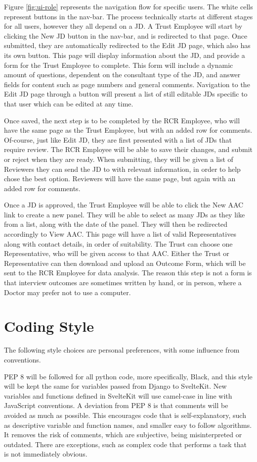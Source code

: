 Figure \ref{fig:ui-role} represents the navigation flow for specific users. The white cells represent buttons in the nav-bar. The process technically starts at different stages for all users, however they all depend on a JD. A Trust Employee will start by clicking the New JD button in the nav-bar, and is redirected to that page. Once submitted, they are automatically redirected to the Edit JD page, which also has its own button. This page will display information about the JD, and provide a form for the Trust Employee to complete. This form will include a dynamic amount of questions, dependent on the consultant type of the JD, and answer fields for content such as page numbers and general comments. Navigation to the Edit JD page through a button will present a list of still editable JDs specific to that user which can be edited at any time.

Once saved, the next step is to be completed by the RCR Employee, who will have the same page as the Trust Employee, but with an added row for comments. Of-course, just like Edit JD, they are first presented with a list of JDs that require review. The RCR Employee will be able to save their changes, and submit or reject when they are ready. When submitting, they will be given a list of Reviewers they can send the JD to with relevant information, in order to help chose the best option. Reviewers will have the same page, but again with an added row for comments. 

Once a JD is approved, the Trust Employee will be able to click the New AAC link to create a new panel. They will be able to select as many JDs as they like from a list, along with the date of the panel. They will then be redirected accordingly to View AAC. This page will have a list of valid Representatives along with contact details, in order of suitability. The Trust can choose one Representative, who will be given access to that AAC. Either the Trust or Representative can then download and upload an Outcome Form, which will be sent to the RCR Employee for data analysis. The reason this step is not a form is that interview outcomes are sometimes written by hand, or in person, where a Doctor may prefer not to use a computer.

\section{Coding Style}
The following style choices are personal preferences, with some influence from conventions. 

PEP 8 will be followed for all python code, more specifically, Black, and this style will be kept the same for variables passed from Django to SvelteKit. New variables and functions defined in SvelteKit will use camel-case in line with JavaScript conventions. A deviation from PEP 8 is that comments will be avoided as much as possible. This encourages code that is self-explanatory, such as descriptive variable and function names, and smaller easy to follow algorithms. It removes the risk of comments, which are subjective, being misinterpreted or outdated. There are exceptions, such as complex code that performs a task that is not immediately obvious.

